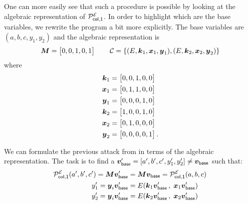 One can more easily see that such a procedure is possible by looking at the algebraic representation of $\PE[col,1]$.
In order to highlight which are the base variables, we rewrite the program a bit more explicitly.
The base variables are $(a, b, c, y_1, y_2)$ and the algebraic representation is
\[
    \M = \begin{bmatrix} 0, 0, 1, 0, 1 \end{bmatrix} 
        \qquad \C = \{(\E, \v k_1, \v x_1, \v y_1), (\E, \v k_2, \v x_2, \v y_2)\}
\]
where
\begin{align*}
\v k_1 &= \begin{bmatrix} 0, 0, 1, 0, 0 \end{bmatrix} \\
\v x_1 &= \begin{bmatrix} 0, 1, 1, 0, 0 \end{bmatrix} \\
\v y_1 &= \begin{bmatrix} 0, 0, 0, 1, 0 \end{bmatrix} \\
\v k_2 &= \begin{bmatrix} 1, 0, 0, 1, 0 \end{bmatrix} \\
\v x_2 &= \begin{bmatrix} 0, 1, 0, 0, 0 \end{bmatrix} \\
\v y_2 &= \begin{bmatrix} 0, 0, 0, 0, 1 \end{bmatrix}.
\end{align*}

We can formulate the previous attack from in terms of the algebraic representation.
The task is to find a $\v v_\base' = [a', b', c', y_1', y_2'] \neq \v v_\base$ such that:
\begin{align}
\label{constraint_output}
\PE[col,1](a', b', c') = \M \vbase' &= \M \vbase = \PE[col,1](a,b,c) \\
\label{constraint_cipher_1}
y_1' = \vy_i \vbase' &=  \E(\vk_1 \vbase'\,, \; \vx_1 \vbase')\\
\label{constraint_cipher_2}
y_2' = \vy_i \vbase' &=  \E(\vk_2 \vbase'\,, \; \vx_2 \vbase')
\end{align}

